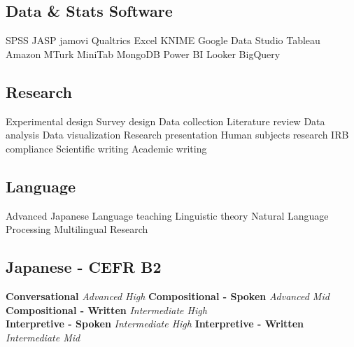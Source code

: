 \documentclass[letterpaper]{deedy-resume_sm} %
\begin{document}
\subsection{Data \& Stats Software}
SPSS \textbullet{} JASP \textbullet{} jamovi \textbullet{} Qualtrics \textbullet{} Excel \textbullet{} KNIME \textbullet{} Google Data Studio \textbullet{} Tableau \textbullet{} Amazon MTurk \textbullet{} MiniTab \textbullet{} MongoDB \textbullet{} Power BI \textbullet{} Looker \textbullet{} BigQuery 
\sectionspace
\subsection{Research}
Experimental design \textbullet{} Survey design \textbullet{} Data collection \textbullet{} Literature review \textbullet{} Data analysis \textbullet{} Data visualization \textbullet{} Research presentation \textbullet{} Human subjects research \textbullet{} IRB compliance \textbullet{} Scientific writing  \textbullet{} Academic writing
\sectionspace
\subsection{Language}
Advanced Japanese \textbullet{} Language teaching \textbullet{} Linguistic theory \textbullet{} Natural Language Processing \textbullet{} Multilingual Research\\
\sectionspace 
\subsection{Japanese - CEFR B2}
\textbf{Conversational} {\footnotesize \textit{Advanced High}} \textbullet{}
\textbf{Compositional - Spoken} {\footnotesize \textit{Advanced Mid}} \textbullet{}
\textbf{Compositional - Written} {\footnotesize \textit{Intermediate High}} \\
\textbf{Interpretive - Spoken} {\footnotesize \textit{Intermediate High}} \textbullet{}
\textbf{Interpretive - Written} {\footnotesize \textit{Intermediate Mid}}
\sectionspace 

\end{document}
